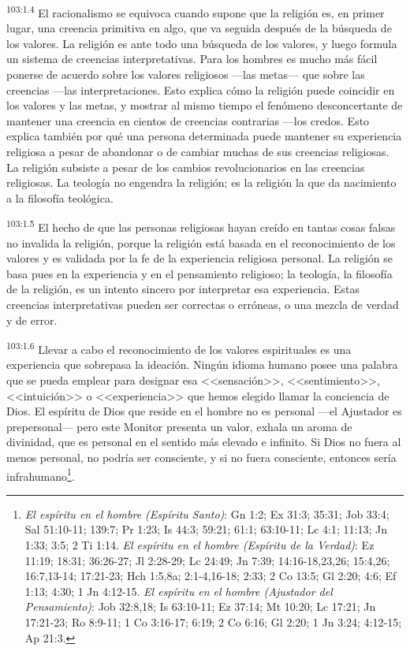 \documentclass[twoside, 11pt]{book}
\begin{document}
\par
\textsuperscript{103:1.4} El racionalismo se equivoca cuando supone que la religión es, en primer lugar, una creencia primitiva en algo, que va seguida después de la búsqueda de los valores. La religión es ante todo una búsqueda de los valores, y luego formula un sistema de creencias interpretativas. Para los hombres es mucho más fácil ponerse de acuerdo sobre los valores religiosos ---las metas--- que sobre las creencias ---las interpretaciones. Esto explica cómo la religión puede coincidir en los valores y las metas, y mostrar al mismo tiempo el fenómeno desconcertante de mantener una creencia en cientos de creencias contrarias ---los credos. Esto explica también por qué una persona determinada puede mantener su experiencia religiosa a pesar de abandonar o de cambiar muchas de sus creencias religiosas. La religión subsiste a pesar de los cambios revolucionarios en las creencias religiosas. La teología no engendra la religión; es la religión la que da nacimiento a la filosofía teológica.

\par
\textsuperscript{103:1.5} El hecho de que las personas religiosas hayan creído en tantas cosas falsas no invalida la religión, porque la religión está basada en el reconocimiento de los valores y es validada por la fe de la experiencia religiosa personal. La religión se basa pues en la experiencia y en el pensamiento religioso; la teología, la filosofía de la religión, es un intento sincero por interpretar esa experiencia. Estas creencias interpretativas pueden ser correctas o erróneas, o una mezcla de verdad y de error.

\par
\textsuperscript{103:1.6} Llevar a cabo el reconocimiento de los valores espirituales es una experiencia que sobrepasa la ideación. Ningún idioma humano posee una palabra que se pueda emplear para designar esa <<sensación>>, <<sentimiento>>, <<intuición>> o <<experiencia>> que hemos elegido llamar la conciencia de Dios. El espíritu de Dios que reside en el hombre no es personal ---el Ajustador es prepersonal--- pero este Monitor presenta un valor, exhala un aroma de divinidad, que es personal en el sentido más elevado e infinito. Si Dios no fuera al menos personal, no podría ser consciente, y si no fuera consciente, entonces sería infrahumano\footnote{\textit{El espíritu en el hombre (Espíritu Santo)}: Gn 1:2; Ex 31:3; 35:31; Job 33:4; Sal 51:10-11; 139:7; Pr 1:23; Is 44:3; 59:21; 61:1; 63:10-11; Lc 4:1; 11:13; Jn 1:33; 3:5; 2 Ti 1:14. \textit{El espíritu en el hombre (Espíritu de la Verdad)}: Ez 11:19; 18:31; 36:26-27; Jl 2:28-29; Lc 24:49; Jn 7:39; 14:16-18,23,26; 15:4,26; 16:7,13-14; 17:21-23; Hch 1:5,8a; 2:1-4,16-18; 2:33; 2 Co 13:5; Gl 2:20; 4:6; Ef 1:13; 4:30; 1 Jn 4:12-15. \textit{El espíritu en el hombre (Ajustador del Pensamiento)}: Job 32:8,18; Is 63:10-11; Ez 37:14; Mt 10:20; Lc 17:21; Jn 17:21-23; Ro 8:9-11; 1 Co 3:16-17; 6:19; 2 Co 6:16; Gl 2:20; 1 Jn 3:24; 4:12-15; Ap 21:3.}.
\end{document}
